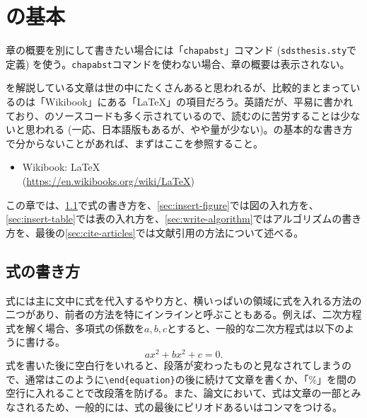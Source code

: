 \chapter{\latex の基本}
\label{chap:latex-basic}

\begin{chapabst}
  章の概要を別にして書きたい場合には「\texttt{chapabst}」コマンド (\texttt{sdsthesis.sty}で定義) を使う。\texttt{chapabst}コマンドを使わない場合、章の概要は表示されない。
\end{chapabst}

\latex を解説している文章は世の中にたくさんあると思われるが、比較的まとまっているのは「Wikibook」にある「LaTeX」の項目だろう。英語だが、平易に書かれており、\latex のソースコードも多く示されているので、読むのに苦労することは少ないと思われる (一応、日本語版もあるが、やや量が少ない)。\latex の基本的な書き方で分からないことがあれば、まずはここを参照すること。
\begin{itemize}
  \item Wikibook: LaTeX \\(\url{https://en.wikibooks.org/wiki/LaTeX})
\end{itemize}

この章では、\cref{sec:write-equation}で式の書き方を、\cref{sec:insert-figure}では図の入れ方を、\cref{sec:insert-table}では表の入れ方を、\cref{sec:write-algorithm}ではアルゴリズムの書き方を、最後の\cref{sec:cite-articles}では文献引用の方法について述べる。

\section{式の書き方}
\label{sec:write-equation}

式には主に文中に式を代入するやり方と、横いっぱいの領域に式を入れる方法の二つがあり、前者の方法を特にインラインと呼ぶこともある。例えば、二次方程式を解く場合、多項式の係数を$a, b, c$とすると、一般的な二次方程式は以下のように書ける。
%
\begin{equation}
  a x^2 + b x^2 + c = 0.
  \label{eq:quadratic-equation}
\end{equation}
%
式を書いた後に空白行をいれると、段落が変わったものと見なされてしまうので、通常はこのように\texttt{\textbackslash end\{equation\}}の後に続けて文章を書くか、「\%」を間の空行に入れることで改段落を防げる。また、論文において、式は文章の一部とみなされるため、一般的には、式の最後にピリオドあるいはコンマをつける。

